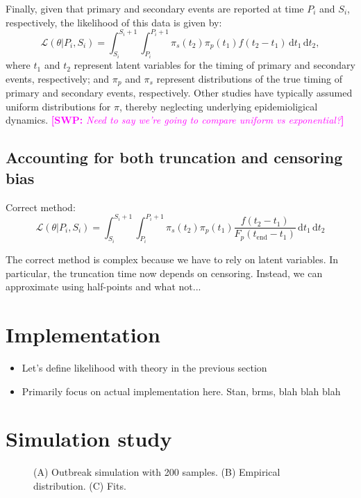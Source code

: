 \documentclass[12pt]{article}
\newcommand{\comment}{\showcomment}
\newcommand{\showcomment}[3]{\textcolor{#1}{\textbf{[#2: }\textsl{#3}\textbf{]}}}
\newcommand{\swp}[1]{\comment{magenta}{SWP}{#1}}
\newcommand{\dd}[1]{\ensuremath{\, \mathrm{d}#1}}
\newcommand{\tend}{{t_{\mathrm{end}}}}
\begin{document}
Finally, given that primary and secondary events are reported at time $P_i$ and $S_i$, respectively, the likelihood of this data is given by:
\begin{equation}
\mathcal L(\theta|P_i, S_i) = \int_{S_i}^{S_i+1} \int_{P_i}^{P_i+1} \pi_s(t_2) \pi_p(t_1) f(t_2-t_1) \dd t_1 \dd t_2,
\end{equation}
where $t_1$ and $t_2$ represent latent variables for the timing of primary and secondary events, respectively;
and $\pi_p$ and $\pi_s$ represent distributions of the true timing of primary and secondary events, respectively.
Other studies have typically assumed uniform distributions for $\pi$, thereby neglecting underlying epidemioligical dynamics.
\swp{Need to say we're going to compare uniform vs exponential?}

\subsection{Accounting for both truncation and censoring bias}

Correct method:
\begin{equation}
\mathcal L(\theta|P_i, S_i) = \int_{S_i}^{S_i+1} \int_{P_i}^{P_i+1} \pi_s(t_2) \pi_p(t_1) \frac{f(t_2 - t_1)}{F_p(\tend-t_1)} \dd t_1 \dd t_2
\end{equation}

The correct method is complex because we have to rely on latent variables. In particular, the truncation time now depends on censoring. Instead, we can approximate using half-points and what not...

\section{Implementation}

\begin{itemize}
  \item Let's define likelihood with theory in the previous section
  \item Primarily focus on actual implementation here. Stan, brms, blah blah blah
\end{itemize}

\section{Simulation study}

\begin{figure}
\caption{
(A) Outbreak simulation with 200 samples. 
(B) Empirical distribution.
(C) Fits.
}
\end{figure}
\end{document}
